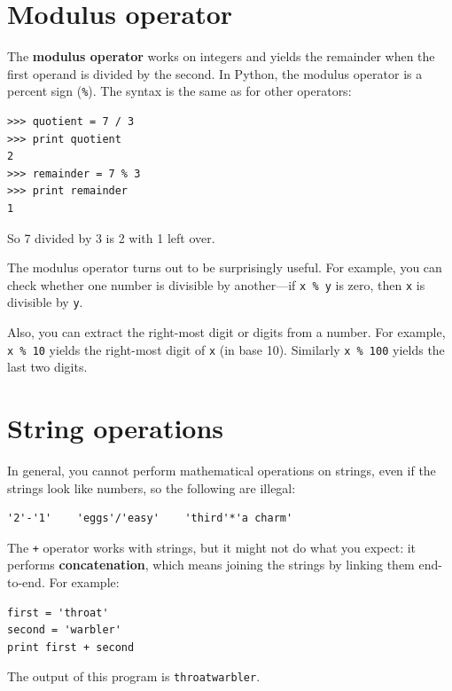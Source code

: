 \documentclass[10pt]{book}
\begin{document}
\section{Modulus operator}


The {\bf modulus operator} works on integers and yields the remainder
when the first operand is divided by the second.  In Python, the
modulus operator is a percent sign (\verb"%").  The syntax is the same
as for other operators:

\beforeverb
\begin{verbatim}
>>> quotient = 7 / 3
>>> print quotient
2
>>> remainder = 7 % 3
>>> print remainder
1
\end{verbatim}
\afterverb
%
So 7 divided by 3 is 2 with 1 left over.

The modulus operator turns out to be surprisingly useful.  For
example, you can check whether one number is divisible by another---if
{\tt x \% y} is zero, then {\tt x} is divisible by {\tt y}.


Also, you can extract the right-most digit
or digits from a number.  For example, {\tt x \% 10} yields the
right-most digit of {\tt x} (in base 10).  Similarly {\tt x \% 100}
yields the last two digits.



\section{String operations}

In general, you cannot perform mathematical operations on strings, even
if the strings look like numbers, so the following are illegal:

\beforeverb
\begin{verbatim}
'2'-'1'    'eggs'/'easy'    'third'*'a charm'
\end{verbatim}
\afterverb
%
The {\tt +} operator works with strings, but it
might not do what you expect: it performs
{\bf concatenation}, which means joining the strings by
linking them end-to-end.  For example:


\beforeverb
\begin{verbatim}
first = 'throat'
second = 'warbler'
print first + second
\end{verbatim}
\afterverb
%
The output of this program is {\tt throatwarbler}.
\end{document}
